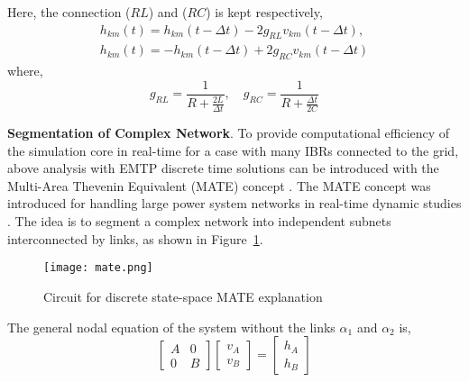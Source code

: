 Here, the connection ($RL$) and ($RC$) is kept respectively, 
\begin{equation}
    \begin{array}{c}
        h_{k m}(t)=h_{k m}(t-\Delta t)-2 g_{R L} v_{k m}(t-\Delta t),\\
        h_{k m}(t)=-h_{k m}(t-\Delta t)+2 g_{R C} v_{k m}(t-\Delta t)
    \end{array}
\end{equation}
where,
\begin{equation}
    g_{R L}=\frac{1}{R+\frac{2 L}{\Delta t}}, \hspace{1em}
    g_{R C}=\frac{1}{R+\frac{\Delta t}{2 C}}
\end{equation}

\textbf{Segmentation of Complex Network}. To provide computational efficiency of the simulation core in real-time for a case with many IBRs connected to the grid, above analysis with EMTP discrete time solutions can be introduced with the Multi-Area Thevenin Equivalent (MATE) concept \autocite{Hollman_2006}. The MATE concept was introduced for handling large power system networks in real-time dynamic studies \autocite{Linares_Rojas_2001, 729230}. The idea is to segment a complex network into independent subnets interconnected by links, as shown in Figure~\cref{fig:mate}. 

\begin{figure}[htbp]
    \centering
    \texttt{[image: mate.png]}
    \caption{Circuit for discrete state-space MATE explanation \autocite{Mart2002OVNIIS}}
    \label{fig:mate}
\end{figure}

The general nodal equation of the system without the links $\alpha_1$ and $\alpha_2$ is,
\begin{equation}
    \left[\begin{array}{l|l}
A & 0 \\
\hline 0 & B
\end{array}\right]\left[\begin{array}{l}
v_{A} \\
\hline v_{B}
\end{array}\right]=\left[\begin{array}{l}
h_{A} \\
\hline h_{B}
\end{array}\right]
\end{equation}

